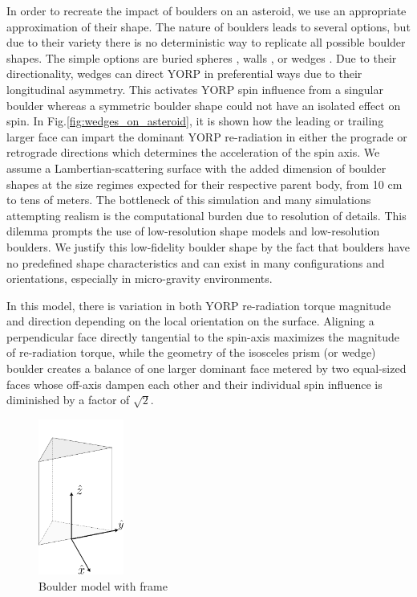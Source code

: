 In order to recreate the impact of boulders on an asteroid, we use an appropriate approximation of their shape. The nature of boulders leads to several options, but due to their variety there is no deterministic way to replicate all possible boulder shapes. The simple options are buried spheres \citep{Golubov2014}, walls \citep{Golubov2017}, or wedges \citep{Bottke2006}. Due to their directionality, wedges can direct YORP in preferential ways due to their longitudinal asymmetry. This activates YORP spin influence from a singular boulder whereas a symmetric boulder shape could not have an isolated effect on spin. In Fig.\ref{fig:wedges_on_asteroid}, it is shown how the leading or trailing larger face can impart the dominant YORP re-radiation in either the prograde or retrograde directions which determines the acceleration of the spin axis. 
We assume a Lambertian-scattering surface with the added dimension of boulder shapes at the size regimes expected for their respective parent body, from 10 cm to tens of meters. The bottleneck of this simulation and many simulations attempting realism is the computational burden due to resolution of details. This dilemma prompts the use of low-resolution shape models and low-resolution boulders. We justify this low-fidelity boulder shape by the fact that boulders have no predefined shape characteristics and can exist in many configurations and orientations, especially in micro-gravity environments.


In this model, there is variation in both YORP re-radiation torque magnitude and direction depending on the local orientation on the surface. Aligning a perpendicular face directly tangential to the spin-axis maximizes the magnitude of re-radiation torque, while the geometry of the isosceles prism (or wedge) boulder creates a balance of one larger dominant face metered by two equal-sized faces whose off-axis dampen each other and their individual spin influence is diminished by a factor of $\sqrt{2}$.

\begin{figure}[H]
    \centering
    \includegraphics[width=0.25\textwidth,height=0.4\textwidth]{fig/prism.png}
    \caption{Boulder model with frame}
    \label{fig:prism}
\end{figure}

